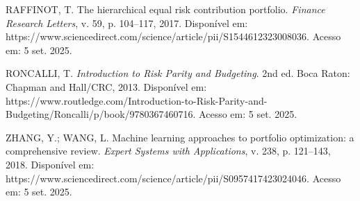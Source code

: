 \begin{thebibliography}{99}
RAFFINOT, T. The hierarchical equal risk contribution portfolio. \textit{Finance Research Letters}, v. 59, p. 104--117, 2017. Disponível em: https://www.sciencedirect.com/science/article/pii/S1544612323008036. Acesso em: 5 set. 2025.

RONCALLI, T. \textit{Introduction to Risk Parity and Budgeting}. 2nd ed. Boca Raton: Chapman and Hall/CRC, 2013. Disponível em: https://www.routledge.com/Introduction-to-Risk-Parity-and-Budgeting/Roncalli/p/book/9780367460716. Acesso em: 5 set. 2025.

ZHANG, Y.; WANG, L. Machine learning approaches to portfolio optimization: a comprehensive review. \textit{Expert Systems with Applications}, v. 238, p. 121--143, 2018. Disponível em: https://www.sciencedirect.com/science/article/pii/S0957417423024046. Acesso em: 5 set. 2025.

\end{thebibliography}